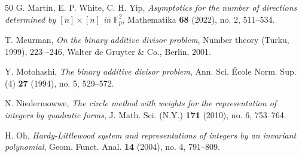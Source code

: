 \documentclass[12pt,reqno]{amsart}
\theoremstyle{definition}
\theoremstyle{remark}
\numberwithin{equation}{section}
\newcommand\1{\mathds{1}}
\begin{document}
\begin{thebibliography}{50}
G. Martin, E. P. White, C. H. Yip, \emph{Asymptotics for the number of directions determined by $[n]\times[n]$ in $\mathbb{F}^2_p$}, Mathematika \textbf{68} (2022), no. 2, 511--534.

 T. Meurman, \emph{On the binary additive divisor problem}, Number theory (Turku, 1999), 223–-246,
Walter de Gruyter \& Co., Berlin, 2001.

Y. Motohashi, \emph{The binary additive divisor problem}, Ann. Sci. \'{E}cole Norm. Sup. (4)   \textbf{27} (1994), no. 5, 529--572.

N. Niedermowwe, \emph{The circle method with weights for the representation of integers by quadratic forms},  J. Math. Sci. (N.Y.) \textbf{171} (2010), no. 6, 753--764.

H. Oh, \emph{Hardy-Littlewood system and representations of integers by an invariant polynomial}, Geom. Funct. Anal. \textbf{14} (2004), no. 4, 791--809.

\end{thebibliography}
\end{document}
